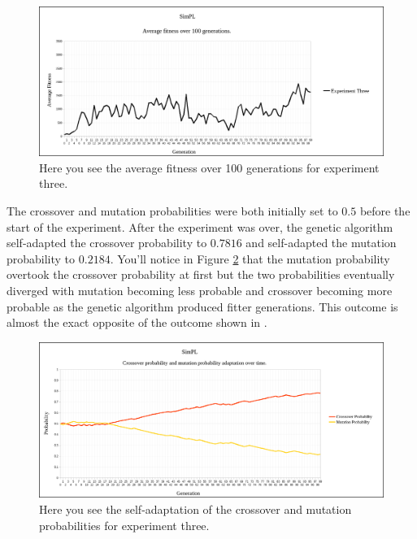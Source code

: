 \documentclass[a4paper,10pt]{article}
\begin{document}
\begin{figure}[H]  
  \centering
  \includegraphics[width=1\textwidth]{figures/exp3_avg_fit.png}
  \caption{Here you see the average fitness over 100 generations for experiment three.}
  \label{fig:exp3_avg_fit}
\end{figure}

The crossover and mutation probabilities were both initially set to $0.5$ before the start of the experiment. After the experiment was over, the genetic algorithm self-adapted the crossover probability to $0.7816$ and self-adapted the mutation probability to $0.2184$. You'll notice in Figure \ref{fig:exp3_self_adapt} that the mutation probability overtook the crossover probability at first but the two probabilities eventually diverged with mutation becoming less probable and crossover becoming more probable as the genetic algorithm produced fitter generations. This outcome is almost the exact opposite of the outcome shown in \cite{self_adapt}.

\begin{figure}[H]  
  \centering
  \includegraphics[width=1\textwidth]{figures/exp3_self_adapt.png}
  \caption{Here you see the self-adaptation of the crossover and mutation probabilities for experiment three.}
  \label{fig:exp3_self_adapt}
\end{figure}
\end{document}
